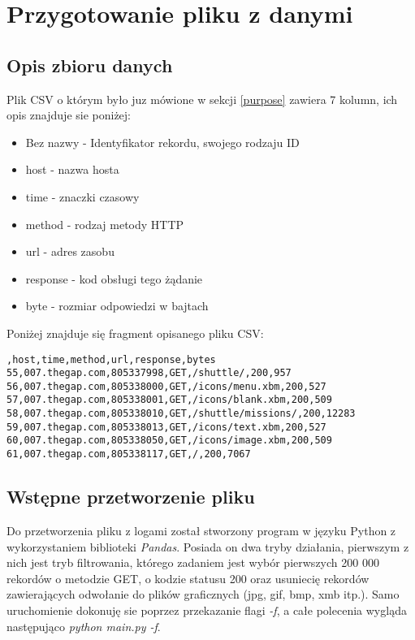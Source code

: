 \documentclass{classrep}
\begin{document}
    \section{Przygotowanie pliku z danymi} {

        \subsection{Opis zbioru danych} {
            Plik CSV o którym było juz mówione w sekcji \ref{purpose} zawiera 7 kolumn,
            ich opis znajduje sie poniżej:
            \begin{itemize}
                \item Bez nazwy - Identyfikator rekordu, swojego rodzaju ID
                \item host - nazwa hosta
                \item time - znaczki czasowy
                \item method - rodzaj metody HTTP
                \item url - adres zasobu
                \item response - kod obsługi tego żądanie
                \item byte - rozmiar odpowiedzi w bajtach
            \end{itemize}

            Poniżej znajduje się fragment opisanego pliku CSV:
            \begin{lstlisting}
,host,time,method,url,response,bytes
55,007.thegap.com,805337998,GET,/shuttle/,200,957
56,007.thegap.com,805338000,GET,/icons/menu.xbm,200,527
57,007.thegap.com,805338001,GET,/icons/blank.xbm,200,509
58,007.thegap.com,805338010,GET,/shuttle/missions/,200,12283
59,007.thegap.com,805338013,GET,/icons/text.xbm,200,527
60,007.thegap.com,805338050,GET,/icons/image.xbm,200,509
61,007.thegap.com,805338117,GET,/,200,7067
            \end{lstlisting}
        }

        \subsection{Wstępne przetworzenie pliku} {
            Do przetworzenia pliku z logami został stworzony program w języku Python z
            wykorzystaniem biblioteki \textit{Pandas}. Posiada on dwa tryby działania,
            pierwszym z nich jest tryb filtrowania, którego zadaniem jest wybór
            pierwszych 200 000 rekordów o metodzie GET, o kodzie statusu 200 oraz
            usuniecię rekordów zawierających odwołanie do plików graficznych
            (jpg, gif, bmp, xmb itp.). Samo uruchomienie dokonuję sie poprzez
            przekazanie flagi \textit{-f}, a całe polecenia wygląda następująco
            \textit{python main.py -f}.

}}
\end{document}
